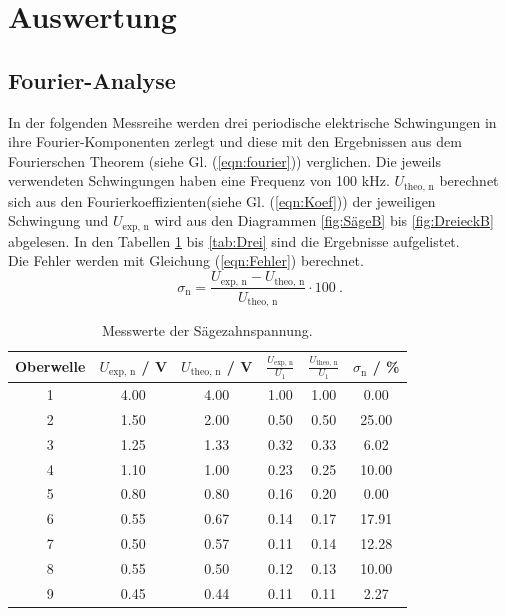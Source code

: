 \section{Auswertung}
\label{sec:Auswertung}

\subsection{Fourier-Analyse}
\label{sec:Analyse}
In der folgenden Messreihe werden drei periodische elektrische Schwingungen in ihre Fourier-Komponenten zerlegt und diese mit den Ergebnissen aus dem Fourierschen Theorem (siehe Gl. (\ref{eqn:fourier})) verglichen. Die jeweils verwendeten Schwingungen haben eine Frequenz von 100 kHz. $U_\text{theo, n}$ berechnet sich aus den Fourierkoeffizienten(siehe Gl. (\ref{eqn:Koef})) der jeweiligen Schwingung und $U_\text{exp, n}$ wird aus den Diagrammen \ref{fig:SägeB} bis \ref{fig:DreieckB} abgelesen. In den Tabellen \ref{tab:Säge} bis \ref{tab:Drei} sind die Ergebnisse aufgelistet. \\
Die Fehler werden mit Gleichung (\ref{eqn:Fehler}) berechnet.
\begin{equation}
  \sigma_\text{n} = \frac{U_\text{exp, n} - U_\text{theo, n}}{U_\text{theo, n}} \cdot 100 \ .
  \label{eqn:Fehler}
\end{equation}

\begin{table}[H] %
  \centering
  \begin{tabular}{c | c | c | c | c | c}
    \toprule
    Oberwelle & $U_\text{exp, n}$ / V & $U_\text{theo, n}$ / V & $\frac{U_\text{exp, n}}{U_1}$ & $\frac{U_\text{theo, n}}{U_1}$ & $\sigma_\text{n}$ / \% \\
    \midrule
    1  & 4.00 & 4.00 & 1.00 & 1.00 & 0.00  \\
    2  & 1.50 & 2.00 & 0.50 & 0.50 & 25.00 \\
    3  & 1.25 & 1.33 & 0.32 & 0.33 & 6.02  \\
    4  & 1.10 & 1.00 & 0.23 & 0.25 & 10.00 \\
    5  & 0.80 & 0.80 & 0.16 & 0.20 & 0.00  \\
    6  & 0.55 & 0.67 & 0.14 & 0.17 & 17.91 \\
    7  & 0.50 & 0.57 & 0.11 & 0.14 & 12.28 \\
    8  & 0.55 & 0.50 & 0.12 & 0.13 & 10.00 \\
    9  & 0.45 & 0.44 & 0.11 & 0.11 & 2.27  \\
    \bottomrule
  \end{tabular}
  \caption{Messwerte der Sägezahnspannung.}
  \label{tab:Säge}
\end{table}

